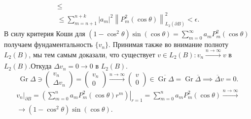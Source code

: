\documentclass[a4paper]{article}
\begin{document}
\begin{sol}
\begin{multline*}
	\le \\ \le  \sum_{m=n+1}^{n+k} |a_m|^2 \left\lVert 
	P_m^2 (\cos \theta)\right\rVert^2_{L_2(\partial B)}
	<\epsilon
.\end{multline*} 
В силу критерия Коши для $\displaystyle (1-\cos^2\theta)\sin(\cos \theta)=
\sum_{m=0}^{\infty} a_m P_m^2 (\cos\theta)$ получаем
фундаментальность $\{v_n\} $. Принимая также во внимание
полноту $L_2(B)$, мы тем самым доказали, что существует
$v \in L_2(B)\colon  v_n \xrightarrow[]{n\to \infty}v$ в
$L_2(B)$.Откуда $\Delta v_n=0\to 0$ в $L_2(B)$.
\[
\operatorname{Gr}\Delta \ni \begin{pmatrix} v_n\\ \Delta v_n \end{pmatrix} = \begin{pmatrix} v_n\\ 0 \end{pmatrix} 
\xrightarrow[]{n\to \infty} \begin{pmatrix} v\\0 \end{pmatrix} 
\in  \overline{ \operatorname{Gr}\Delta}=
\operatorname{Gr}\overline{\Delta}\implies \overline{\Delta}v=0
.\] 
\begin{multline*}
	v_n|_{\partial B}= \left. \left( \sum_{m=0}^{n} a_m P_m^2
	(\cos\theta)r^m\right)  \right|_{r=1}=
	\sum_{m=0}^{n} a_m P_m^2(\cos \theta)\xrightarrow[]{n\to \infty}\\\to 
	(1-\cos^2 \theta) \sin (\cos \theta)
.\end{multline*} 
\end{sol}
\end{document}

